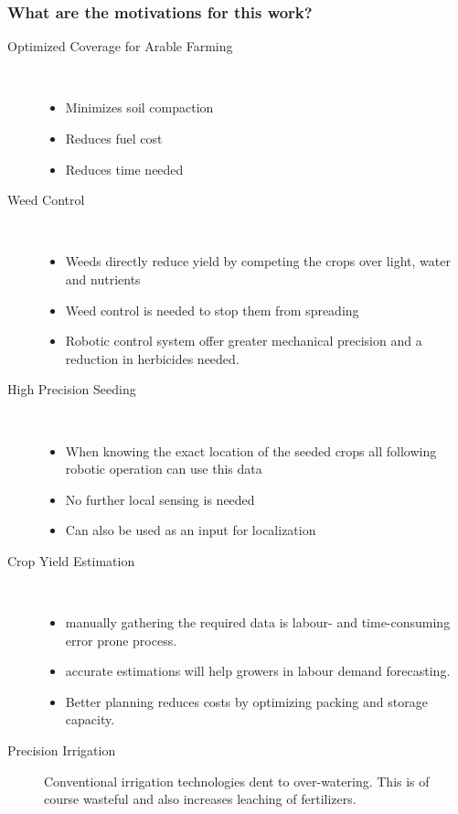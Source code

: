 \documentclass{article}
\begin{document}
\subsubsection*{What are the motivations for this work?}
\begin{description}

    \item[Optimized Coverage for Arable Farming] \
    \begin{itemize}
        \item Minimizes soil compaction
        \item Reduces fuel cost
        \item Reduces time needed
    \end{itemize}
    \item[Weed Control] \
    \begin{itemize}
        \item Weeds directly reduce yield by competing the crops over light, water and nutrients
        \item Weed control is needed to stop them from spreading
        \item Robotic control system offer greater mechanical precision and a reduction in herbicides needed.
    \end{itemize}
    \item[High Precision Seeding] \
    \begin{itemize}
        \item When knowing the exact location of the seeded crops all following robotic operation can use this data
        \item No further local sensing is needed
        \item Can also be used as an input for localization
    \end{itemize}
    \item[Crop Yield Estimation] \
    \begin{itemize}
        \item manually gathering the required data is labour- and time-consuming error prone process.
        \item accurate estimations will help growers in labour demand forecasting. 
        \item Better planning reduces costs by optimizing packing and storage capacity.
    \end{itemize}
    \item[Precision Irrigation] Conventional irrigation technologies dent to over-watering. 
    This is of course wasteful and also increases leaching of fertilizers.

\end{description}
\end{document}
